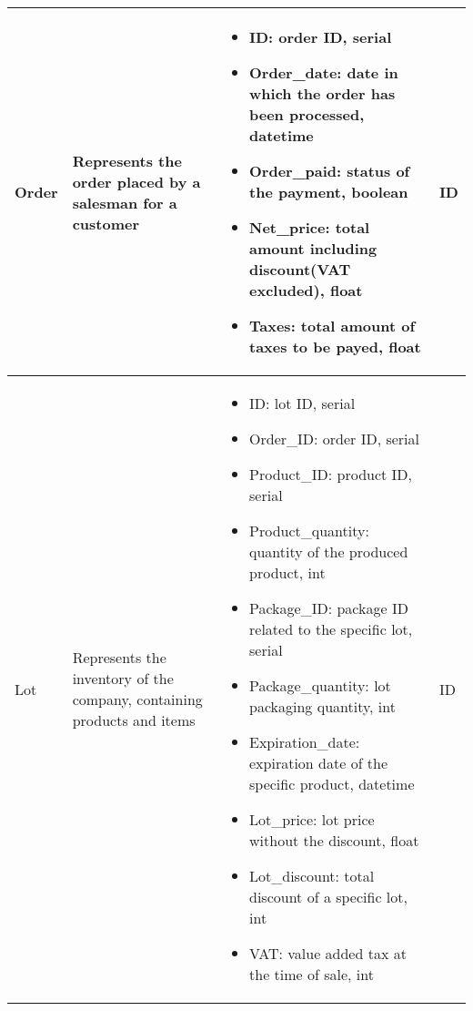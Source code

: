 \begin{longtable}{|p{}|p{} |p{}|p{} |}
    Order & Represents the order placed by a salesman for a customer &
    \begin{itemize}
        \vspace{-1em}
        \item ID:   order ID, serial
        \item Order\_date:   date in which the order has been processed, datetime
        \item Order\_paid:   status of the payment, boolean
        \item Net\_price:   total amount including discount(VAT excluded), float    %
        \item Taxes:   total amount of taxes to be payed, float                     %
    \end{itemize}
    &  ID \\\hline

    Lot & Represents the inventory of the company, containing products and items &
    \begin{itemize}
        \vspace{-1em}
        \item ID:   lot ID, serial
        \item Order\_ID:   order ID, serial     %
        \item Product\_ID:   product ID, serial
        \item Product\_quantity:   quantity of the produced product, int
        \item Package\_ID:   package ID related to the specific lot, serial
        \item Package\_quantity:   lot packaging quantity, int
        \item Expiration\_date:   expiration date of the specific product, datetime
        \item Lot\_price:   lot price without the discount, float
        \item Lot\_discount:   total discount of a specific lot, int
        \item VAT:   value added tax at the time of sale, int
    \end{itemize}
    &  ID \\\hline


\end{longtable}

